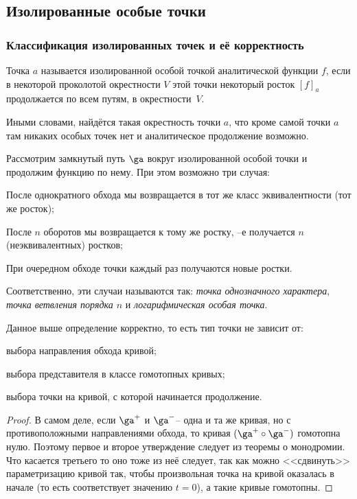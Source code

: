 \documentclass[a4paper]{article}
\begin{document}
\subsection{Изолированные особые точки}

\subsubsection{Классификация изолированных точек и её корректность}

\begin{df}
Точка $a$ называется изолированной особой точкой аналитической функции $f$, если в некоторой проколотой
окрестности $V$ этой точки некоторый росток $[f]_a$ продолжается по всем путям, в окрестности~$V$.
\end{df}

Иными словами, найдётся такая окрестность точки $a$, что кроме самой точки $a$ там никаких особых точек нет
и аналитическое продолжение возможно.

\begin{df}
Рассмотрим замкнутый путь $\ga$ вокруг изолированной особой точки и продолжим функцию по нему. При этом возможно
три случая:

\begin{nums}{-2}
\item После однократного обхода мы возвращается в тот же класс эквивалентности (тот же росток);
\item После $n$ оборотов мы возвращается к тому же ростку, --е получается $n$ (неэквивалентных) ростков;
\item При очередном обходе точки каждый раз получаются новые ростки.
\end{nums}

Соответственно, эти случаи называются так: \emph{точка однозначного характера}, \emph{точка ветвления порядка $n$} и
\emph{логарифмическая особая точка}.
\end{df}

\begin{stm}
Данное выше определение корректно, то есть тип точки не зависит от:
\begin{items}{-2}
\item выбора направления обхода кривой;
\item выбора представителя в классе гомотопных кривых;
\item выбора точки на кривой, с которой начинается продолжение.
\end{items}
\end{stm}
\begin{proof}
В самом деле, если $\ga^+$ и $\ga^-$-- одна и та же кривая, но с противоположными направлениями обхода, то
кривая $(\ga^+ \circ \ga^-)$ гомотопна нулю. Поэтому первое и второе утверждение следует из теоремы о монодромии.
Что касается третьего то оно тоже из неё следует, так как можно <<сдвинуть>> параметризацию кривой так, чтобы
произвольная точка на кривой оказалась в начале (то есть соответствует значению $t=0$), а такие кривые гомотопны.
\end{proof}
\end{document}
